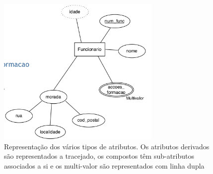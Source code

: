 \documentclass[11pt,twoside,a4paper]{report}
\begin{document}
\begin{figure}[H]
	\begin{center}
		\includegraphics[width=0.7\textwidth]{notacao8} %
		\caption{Representação dos vários tipos de atributos. Os atributos derivados são representados a tracejado, os compostos têm sub-atributos associados a si e os multi-valor são representados com linha dupla}
		\label{fig:der11}
	\end{center}
\end{figure}
\end{document}
